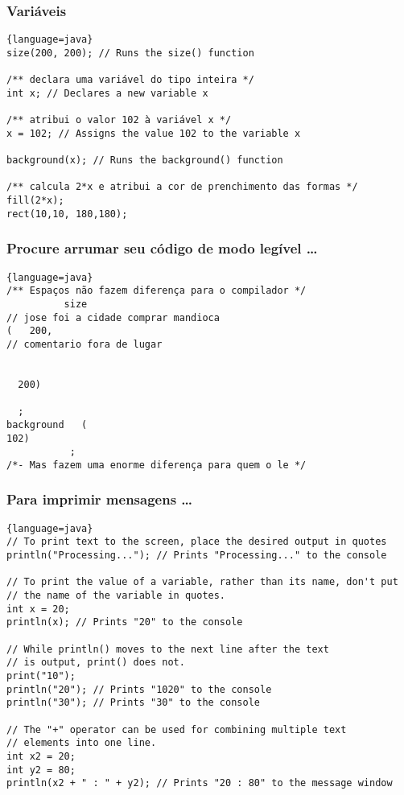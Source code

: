 \documentclass{beamer}
\begin{document}
\begin{frame}[fragile]
\frametitle{Variáveis}
\begin{lstlisting}{language=java}
size(200, 200); // Runs the size() function

/** declara uma variável do tipo inteira */
int x; // Declares a new variable x

/** atribui o valor 102 à variável x */
x = 102; // Assigns the value 102 to the variable x

background(x); // Runs the background() function

/** calcula 2*x e atribui a cor de prenchimento das formas */
fill(2*x); 
rect(10,10, 180,180); 
\end{lstlisting}
\end{frame}

\begin{frame}[fragile]
\frametitle{Procure arrumar seu código de modo legível \dots}
\begin{lstlisting}{language=java}
/** Espaços não fazem diferença para o compilador */
		  size
// jose foi a cidade comprar mandioca
(   200,
// comentario fora de lugar


  200)      
  
  ;
background   (       
102)
           ;
/*- Mas fazem uma enorme diferença para quem o le */
\end{lstlisting}
\end{frame}

\begin{frame}[fragile]
\frametitle{Para imprimir mensagens \dots}
\begin{lstlisting}{language=java}
// To print text to the screen, place the desired output in quotes
println("Processing..."); // Prints "Processing..." to the console

// To print the value of a variable, rather than its name, don't put
// the name of the variable in quotes.
int x = 20;
println(x); // Prints "20" to the console

// While println() moves to the next line after the text
// is output, print() does not.
print("10");
println("20"); // Prints "1020" to the console
println("30"); // Prints "30" to the console

// The "+" operator can be used for combining multiple text
// elements into one line.
int x2 = 20;
int y2 = 80;
println(x2 + " : " + y2); // Prints "20 : 80" to the message window 
\end{lstlisting}
\end{frame}
\end{document}
